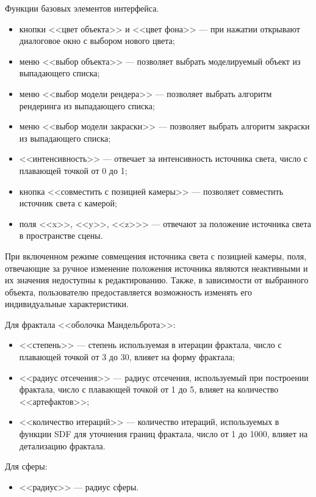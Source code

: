 Функции базовых элементов интерфейса.
\begin{itemize}
  \item кнопки <<цвет объекта>> и <<цвет фона>> --- при нажатии открывают диалоговое окно с выбором нового цвета;
  \item меню <<выбор объекта>> --- позволяет выбрать моделируемый объект из выпадающего списка;
  \item меню <<выбор модели рендера>> --- позволяет выбрать алгоритм рендеринга из выпадающего списка;
  \item меню <<выбор модели закраски>> --- позволяет выбрать алгоритм закраски из выпадающего списка;
  \item <<интенсивность>> --- отвечает за интенсивность источника света, число с плавающей точкой от 0 до 1;
  \item кнопка <<совместить с позицией камеры>> --- позволяет совместить источник света с камерой;
  \item поля <<x>>, <<y>>, <<z>>> --- отвечают за положение источника света в пространстве сцены.
\end{itemize}

При включенном режиме совмещения источника света с позицией камеры, поля, отвечающие за ручное изменение положения источника
являются неактивными и их значения недоступны к редактированию.
Также, в зависимости от выбранного объекта, пользователю предоставляется возможность изменять его индивидуальные характеристики.

Для фрактала <<оболочка Мандельброта>>:

\begin{itemize}
  \item <<степень>> --- степень используемая в итерации фрактала, число с плавающей точкой от 3 до 30, влияет на форму фрактала;
  \item <<радиус отсечения>> --- радиус отсечения, используемый при построении фрактала, число с плавающей точкой от 1 до 5, влияет на количество <<артефактов>>;
  \item <<количество итераций>> --- количество итераций, используемых в функции SDF для уточнения границ фрактала, число от 1 до 1000, влияет на детализацию фрактала.
\end{itemize}

Для сферы:

\begin{itemize}
  \item <<радиус>> --- радиус сферы.
\end{itemize}

